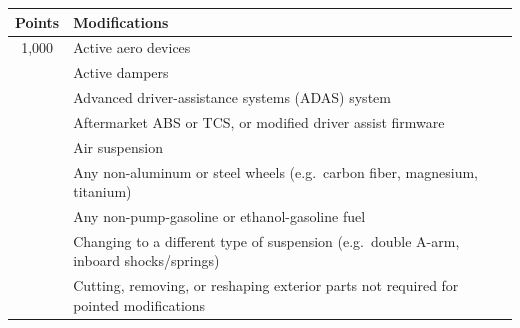 \documentclass{article}
\newenvironment{legallist}{
    \begin{enumerate}[label*=\arabic*.]
}{
    \end{enumerate}
}
\newenvironment{mods}{
    \begin{longtable}{c p{6in}}
    \toprule
    \textbf{Points} & \textbf{Modifications} \\
    \midrule
}{
    \bottomrule
    \end{longtable}
}
\begin{document}
\begin{legallist}
			\begin{mods}
				1,000 & Active aero devices \\
				& Active dampers \\
				& Advanced driver-assistance systems (ADAS) system \\
				& Aftermarket ABS or TCS, or modified driver assist firmware \\
				& Air suspension \\
				& Any non-aluminum or steel wheels (e.g.\ carbon fiber, magnesium, titanium) \\
				& Any non-pump-gasoline or ethanol-gasoline fuel \\
				& Changing to a different type of suspension (e.g.\ double A-arm, inboard shocks/springs) \\
				& Cutting, removing, or reshaping exterior parts not required for pointed modifications \\
			\end{mods}
						
		\end{legallist}
				
\end{document}
